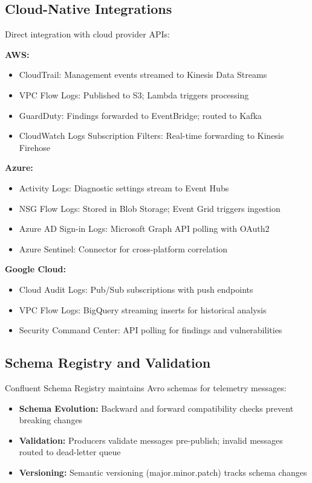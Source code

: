 \subsection{Cloud-Native Integrations}
Direct integration with cloud provider APIs:

\textbf{AWS:}
\begin{itemize}
    \item CloudTrail: Management events streamed to Kinesis Data Streams
    \item VPC Flow Logs: Published to S3; Lambda triggers processing
    \item GuardDuty: Findings forwarded to EventBridge; routed to Kafka
    \item CloudWatch Logs Subscription Filters: Real-time forwarding to Kinesis Firehose
\end{itemize}

\textbf{Azure:}
\begin{itemize}
    \item Activity Logs: Diagnostic settings stream to Event Hubs
    \item NSG Flow Logs: Stored in Blob Storage; Event Grid triggers ingestion
    \item Azure AD Sign-in Logs: Microsoft Graph API polling with OAuth2
    \item Azure Sentinel: Connector for cross-platform correlation
\end{itemize}

\textbf{Google Cloud:}
\begin{itemize}
    \item Cloud Audit Logs: Pub/Sub subscriptions with push endpoints
    \item VPC Flow Logs: BigQuery streaming inserts for historical analysis
    \item Security Command Center: API polling for findings and vulnerabilities
\end{itemize}

\subsection{Schema Registry and Validation}
Confluent Schema Registry maintains Avro schemas for telemetry messages:
\begin{itemize}
    \item \textbf{Schema Evolution:} Backward and forward compatibility checks prevent breaking changes
    \item \textbf{Validation:} Producers validate messages pre-publish; invalid messages routed to dead-letter queue
    \item \textbf{Versioning:} Semantic versioning (major.minor.patch) tracks schema changes
\end{itemize}

